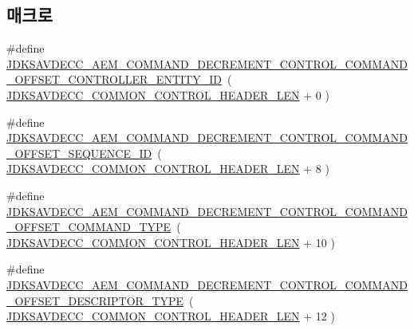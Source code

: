 \subsection*{매크로}
\begin{DoxyCompactItemize}
\item 
\#define \hyperlink{group__command__decrement__control_ga497dcf2ac9bfaa007e26145b5b9492fe}{J\+D\+K\+S\+A\+V\+D\+E\+C\+C\+\_\+\+A\+E\+M\+\_\+\+C\+O\+M\+M\+A\+N\+D\+\_\+\+D\+E\+C\+R\+E\+M\+E\+N\+T\+\_\+\+C\+O\+N\+T\+R\+O\+L\+\_\+\+C\+O\+M\+M\+A\+N\+D\+\_\+\+O\+F\+F\+S\+E\+T\+\_\+\+C\+O\+N\+T\+R\+O\+L\+L\+E\+R\+\_\+\+E\+N\+T\+I\+T\+Y\+\_\+\+ID}~( \hyperlink{group__jdksavdecc__avtp__common__control__header_gaae84052886fb1bb42f3bc5f85b741dff}{J\+D\+K\+S\+A\+V\+D\+E\+C\+C\+\_\+\+C\+O\+M\+M\+O\+N\+\_\+\+C\+O\+N\+T\+R\+O\+L\+\_\+\+H\+E\+A\+D\+E\+R\+\_\+\+L\+EN} + 0 )
\item 
\#define \hyperlink{group__command__decrement__control_ga7205f1d484132916b7fe8db975109d72}{J\+D\+K\+S\+A\+V\+D\+E\+C\+C\+\_\+\+A\+E\+M\+\_\+\+C\+O\+M\+M\+A\+N\+D\+\_\+\+D\+E\+C\+R\+E\+M\+E\+N\+T\+\_\+\+C\+O\+N\+T\+R\+O\+L\+\_\+\+C\+O\+M\+M\+A\+N\+D\+\_\+\+O\+F\+F\+S\+E\+T\+\_\+\+S\+E\+Q\+U\+E\+N\+C\+E\+\_\+\+ID}~( \hyperlink{group__jdksavdecc__avtp__common__control__header_gaae84052886fb1bb42f3bc5f85b741dff}{J\+D\+K\+S\+A\+V\+D\+E\+C\+C\+\_\+\+C\+O\+M\+M\+O\+N\+\_\+\+C\+O\+N\+T\+R\+O\+L\+\_\+\+H\+E\+A\+D\+E\+R\+\_\+\+L\+EN} + 8 )
\item 
\#define \hyperlink{group__command__decrement__control_ga0ca0485e4adbaab0bd871a8750f20a85}{J\+D\+K\+S\+A\+V\+D\+E\+C\+C\+\_\+\+A\+E\+M\+\_\+\+C\+O\+M\+M\+A\+N\+D\+\_\+\+D\+E\+C\+R\+E\+M\+E\+N\+T\+\_\+\+C\+O\+N\+T\+R\+O\+L\+\_\+\+C\+O\+M\+M\+A\+N\+D\+\_\+\+O\+F\+F\+S\+E\+T\+\_\+\+C\+O\+M\+M\+A\+N\+D\+\_\+\+T\+Y\+PE}~( \hyperlink{group__jdksavdecc__avtp__common__control__header_gaae84052886fb1bb42f3bc5f85b741dff}{J\+D\+K\+S\+A\+V\+D\+E\+C\+C\+\_\+\+C\+O\+M\+M\+O\+N\+\_\+\+C\+O\+N\+T\+R\+O\+L\+\_\+\+H\+E\+A\+D\+E\+R\+\_\+\+L\+EN} + 10 )
\item 
\#define \hyperlink{group__command__decrement__control_ga2be571e0600567e6ba031bde28b57835}{J\+D\+K\+S\+A\+V\+D\+E\+C\+C\+\_\+\+A\+E\+M\+\_\+\+C\+O\+M\+M\+A\+N\+D\+\_\+\+D\+E\+C\+R\+E\+M\+E\+N\+T\+\_\+\+C\+O\+N\+T\+R\+O\+L\+\_\+\+C\+O\+M\+M\+A\+N\+D\+\_\+\+O\+F\+F\+S\+E\+T\+\_\+\+D\+E\+S\+C\+R\+I\+P\+T\+O\+R\+\_\+\+T\+Y\+PE}~( \hyperlink{group__jdksavdecc__avtp__common__control__header_gaae84052886fb1bb42f3bc5f85b741dff}{J\+D\+K\+S\+A\+V\+D\+E\+C\+C\+\_\+\+C\+O\+M\+M\+O\+N\+\_\+\+C\+O\+N\+T\+R\+O\+L\+\_\+\+H\+E\+A\+D\+E\+R\+\_\+\+L\+EN} + 12 )

\end{DoxyCompactItemize}
